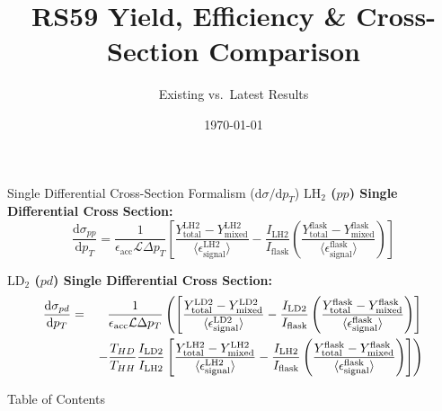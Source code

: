 \documentclass[aspectratio=169, 10pt]{beamer}
\title[RS59 XSec Comparison]{RS59 Yield, Efficiency \& Cross-Section Comparison}
\subtitle{Existing vs.\ Latest Results}
\date{\today}
\providecommand{\diffd}{\mathrm{d}}
\begin{document}
\begin{frame}
    \titlepage
\end{frame}

\begin{frame}{Single Differential Cross-Section Formalism ($\diffd\sigma / \diffd p_T$)}
    \textbf{$\text{LH}_2$ ($pp$) Single Differential Cross Section:}
    \begin{equation}
        \frac{\diffd\sigma_{pp}}{\diffd p_{T}} = \frac{1}{\epsilon_{\text{acc}} \mathcal{L} \Delta p_{T}} 
        \left[ 
            \frac{Y^{\text{LH2}}_{\text{total}} - Y^{\text{LH2}}_{\text{mixed}}}{\langle\epsilon^{\text{LH2}}_{\text{signal}}\rangle} 
- \frac{I_{\text{LH2}}}{I_{\text{flask}}} 
            \left( \frac{Y^{\text{flask}}_{\text{total}} - Y^{\text{flask}}_{\text{mixed}}}{\langle\epsilon^{\text{flask}}_{\text{signal}}\rangle} \right)
        \right]
        \label{eq:modified_cross_section_pt}
    \end{equation}

    \vspace{0.3em}
    \textbf{$\text{LD}_2$ ($pd$) Single Differential Cross Section:}
    {\small
    \begin{eqnarray}
        \frac{\diffd\sigma_{pd}}{\diffd p_{T}} &=& \frac{1}{\epsilon_{\text{acc}} \mathcal{L} \Delta p_{T}} 
        \left(
        \left[ 
            \frac{Y^{\text{LD2}}_{\text{total}} - Y^{\text{LD2}}_{\text{mixed}}}{\langle\epsilon^{\text{LD2}}_{\text{signal}}\rangle} 
- \frac{I_{\text{LD2}}}{I_{\text{flask}}} 
            \left( \frac{Y^{\text{flask}}_{\text{total}} - Y^{\text{flask}}_{\text{mixed}}}{\langle\epsilon^{\text{flask}}_{\text{signal}}\rangle} \right)
        \right] \right. \nonumber \\
        & & \left. - \frac{T_{HD}}{T_{HH}} \frac{I_{\rm LD2}}{I_{\rm LH2}}\left[ 
            \frac{Y^{\text{LH2}}_{\text{total}} - Y^{\text{LH2}}_{\text{mixed}}}{\langle\epsilon^{\text{LH2}}_{\text{signal}}\rangle} 
- \frac{I_{\text{LH2}}}{I_{\text{flask}}} 
            \left( \frac{Y^{\text{flask}}_{\text{total}} - Y^{\text{flask}}_{\text{mixed}}}{\langle\epsilon^{\text{flask}}_{\text{signal}}\rangle} \right)
        \right]
        \right)
        \label{eq:modified_cross_section_pd_pt}
    \end{eqnarray}
    }
\end{frame}

\begin{frame}{Table of Contents}
    \tableofcontents
\end{frame}
\end{document}
